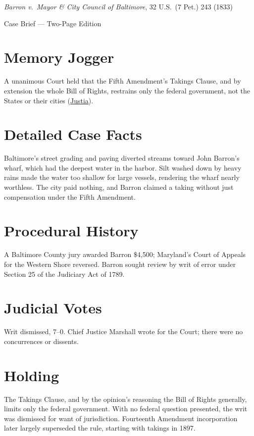 \documentclass[12pt]{article}
\begin{document}
\begin{center}
{\LARGE \textit{Barron v.\ Mayor \& City Council of Baltimore}, 32 U.S.\ (7 Pet.) 243 (1833)\par}
\vspace{0.5em}
{\large Case Brief --- Two-Page Edition\par}
\end{center}

\section{Memory Jogger}
A unanimous Court held that the Fifth Amendment's Takings Clause, and by extension the whole Bill of Rights, restrains only the federal government, not the States or their cities (\href{https://supreme.justia.com/cases/federal/us/32/243/}{Justia}).

\section{Detailed Case Facts}
Baltimore's street grading and paving diverted streams toward John Barron's wharf, which had the deepest water in the harbor. Silt washed down by heavy rains made the water too shallow for large vessels, rendering the wharf nearly worthless. The city paid nothing, and Barron claimed a taking without just compensation under the Fifth Amendment.

\section{Procedural History}
A Baltimore County jury awarded Barron \$4,500; Maryland's Court of Appeals for the Western Shore reversed. Barron sought review by writ of error under Section 25 of the Judiciary Act of 1789.

\section{Judicial Votes}
Writ dismissed, 7--0. Chief Justice Marshall wrote for the Court; there were no concurrences or dissents.

\section{Holding}
The Takings Clause, and by the opinion's reasoning the Bill of Rights generally, limits only the federal government. With no federal question presented, the writ was dismissed for want of jurisdiction. Fourteenth Amendment incorporation later largely superseded the rule, starting with takings in 1897.
\end{document}
